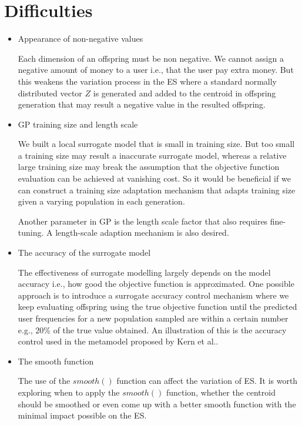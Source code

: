 \documentclass{article}
\begin{document}
\section{Difficulties}
\begin{itemize}
    \item Appearance of non-negative values
    
    Each dimension of an offspring must be non negative. We cannot assign a negative amount of money to a user i.e., that the user pay extra money. But this weakens the variation process in the ES where a standard normally distributed vector $Z$ is generated and added to the centroid in offspring generation that may result a negative value in the resulted offspring. 
    
    \item GP training size and length scale
    
    We built a local surrogate model that is small in training size. But too small a training size may result a inaccurate surrogate model, whereas a relative large training size may break the assumption that the objective function evaluation can be achieved at vanishing cost. So it would be beneficial if we can construct a training size adaptation mechanism that adapts training size given a varying population in each generation. 
    
    Another parameter in GP is the length scale factor that also requires fine-tuning. A length-scale adaption mechanism is also desired.
    
    \item The accuracy of the surrogate model 
    
    The effectiveness of surrogate modelling largely depends on the model accuracy i.e., how good the objective function is approximated. One possible approach is to introduce a surrogate accuracy control mechanism where we keep evaluating offspring using the true objective function until the predicted user frequencies for a new population sampled are within a certain number e.g., 20\% of the true value obtained. An illustration of this is the accuracy control used in the metamodel proposed by Kern et al.\cite{10.1007/11844297_95}.  
    
    \item The smooth function 
    
    The use of the $smooth()$ function can affect the variation of ES. It is worth exploring when to apply the $smooth()$ function, whether the centroid should be smoothed or even come up with a better smooth function with the minimal impact possible on the ES.
    
\end{itemize}
\end{document}
